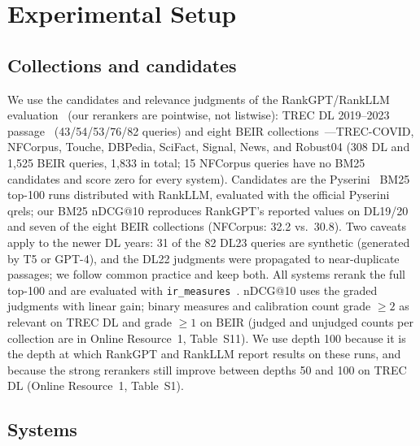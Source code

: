 \section{Experimental Setup}\label{sec:setup}

\subsection{Collections and candidates}

We use the candidates and relevance judgments of the RankGPT/RankLLM evaluation~\cite{sun2023rankgpt,rankllm} (our rerankers are pointwise, not listwise): TREC DL 2019--2023 passage~\cite{craswell2020dl19,craswell2021dl20,craswell2022dl21,craswell2023dl22,craswell2024dl23} (43/54/53/76/82 queries) and eight BEIR collections~\cite{thakur2021beir}---TREC-COVID, NFCorpus, Touche, DBPedia, SciFact, Signal, News, and Robust04 (308 DL and 1{,}525 BEIR queries, 1{,}833 in total; 15 NFCorpus queries have no BM25 candidates and score zero for every system).
Candidates are the Pyserini~\cite{pyserini} BM25 top-100 runs distributed with RankLLM, evaluated with the official Pyserini qrels; our BM25 nDCG@10 reproduces RankGPT's reported values on DL19/20 and seven of the eight BEIR collections (NFCorpus: 32.2 vs.\ 30.8).
Two caveats apply to the newer DL years: 31 of the 82 DL23 queries are synthetic (generated by T5 or GPT-4), and the DL22 judgments were propagated to near-duplicate passages; we follow common practice and keep both.
All systems rerank the full top-100 and are evaluated with \texttt{ir\_measures}~\cite{irmeasures}. nDCG@10 uses the graded judgments with linear gain; binary measures and calibration count grade $\ge2$ as relevant on TREC DL and grade $\ge1$ on BEIR (judged and unjudged counts per collection are in Online Resource~1, Table~S11). We use depth 100 because it is the depth at which RankGPT and RankLLM report results on these runs, and because the strong rerankers still improve between depths 50 and 100 on TREC DL (Online Resource~1, Table~S1).

\subsection{Systems}

